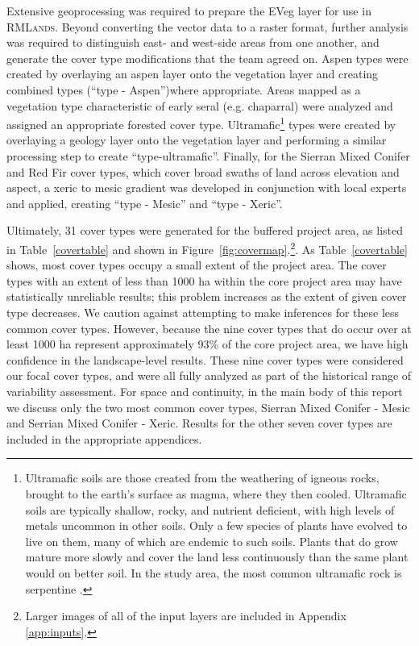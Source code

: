 Extensive geoprocessing was required to prepare the EVeg layer for use in \textsc{RMLands}. Beyond converting the vector data to a raster format, further analysis was required to distinguish east- and west-side areas from one another, and generate the cover type modifications that the team agreed on. Aspen types were created by overlaying an aspen layer onto the vegetation layer and creating combined types (``type - Aspen'')where appropriate. Areas mapped as a vegetation type characteristic of early seral (e.g. chaparral) were analyzed and assigned an appropriate forested cover type. Ultramafic\footnote{Ultramafic soils are those created from the weathering of igneous rocks, brought to the earth's surface as magma, where they then cooled. Ultramafic soils are typically shallow, rocky, and nutrient deficient, with high levels of metals uncommon in other soils. Only a few species of plants have evolved to live on them, many of which are endemic to such soils. Plants that do grow mature more slowly and cover the land less continuously than the same plant would on better soil. In the study area, the most common ultramafic rock is serpentine \citep{Safford2004}.} types were created by overlaying a geology layer onto the vegetation layer and performing a similar processing step to create ``type-ultramafic''. Finally, for the Sierran Mixed Conifer and Red Fir cover types, which cover broad swaths of land across elevation and aspect, a xeric to mesic gradient was developed in conjunction with local experts and applied, creating ``type - Mesic'' and ``type - Xeric''. 

Ultimately, 31 cover types were generated for the buffered project area, as listed in Table~\ref{covertable} and shown in Figure~\ref{fig:covermap}.\footnote{Larger images of all of the input layers are included in Appendix \ref{app:inputs}.}. %
As Table~\ref{covertable} shows, most cover types occupy a small extent of the project area. The cover types with an extent of less than 1000 ha within the core project area may have statistically unreliable results; this problem increases as the extent of given cover type decreases. We caution against attempting to make inferences for these less common cover types. However, because the nine cover types that do occur over at least 1000 ha represent approximately 93\% of the core project area, we have high confidence in the landscape-level results. These nine cover types were considered our focal cover types, and were all fully analyzed as part of the historical range of variability assessment. For space and continuity, in the main body of this report we discuss only the two most common cover types, Sierran Mixed Conifer - Mesic and Serrian Mixed Conifer - Xeric. Results for the other seven cover types are included in the appropriate appendices. 

